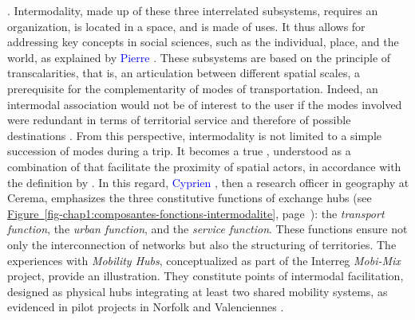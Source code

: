 \begin{refsegment}
{} \textcolor{blue}{\autocites[65]{bozzani_intermodalite_2005}[167]{bozzani_grandes_2006}}. Intermodality, made up of these three interrelated subsystems, requires an organization, is located in a space, and is made of uses. It thus allows for addressing key concepts in social sciences, such as the individual, place, and the world, as explained by \textcolor{blue}{Pierre} \textcolor{blue}{\textcite[490]{ageron_intermodalite-voyageurs_2013}}. These subsystems are based on the principle of transcalarities, that is, an articulation between different spatial scales, a prerequisite for the complementarity of modes of transportation. Indeed, an intermodal association would not be of interest to the user if the modes involved were redundant in terms of territorial service and therefore of possible destinations \textcolor{blue}{\autocite[45]{ageron_intermodalite-voyageurs_2013}}. From this perspective, intermodality is not limited to a simple succession of modes during a trip. It becomes a true , understood as a combination of  that facilitate the proximity of spatial actors, in accordance with the definition by \textcolor{blue}{\textcite[6]{gumuchian_ressource_2007}}. In this regard, \textcolor{blue}{Cyprien} \textcolor{blue}{\textcite[14]{richer_lemergence_2008}}, then a research officer in geography at \acrshort{Cerema}, emphasizes the three constitutive functions of exchange hubs (see \hyperref[fig-chap1:composantes-fonctions-intermodalite]{Figure~\ref{fig-chap1:composantes-fonctions-intermodalite}}, page~\pageref{fig-chap1:tad-murdoch}): the \textsl{transport function}, the \textsl{urban function}, and the \textsl{service function}. These functions ensure not only the interconnection of networks but also the structuring of territories. The experiences with \textsl{Mobility Hubs}, conceptualized as part of the Interreg \textsl{Mobi-Mix} project, provide an illustration. They constitute points of intermodal facilitation, designed as physical hubs integrating at least two shared mobility systems, as evidenced in pilot projects in Norfolk and Valenciennes \textcolor{blue}{\autocites[3498]{hachette_exploring_2023}[248]{hachette_mobility_2023}}.%


\end{refsegment}
